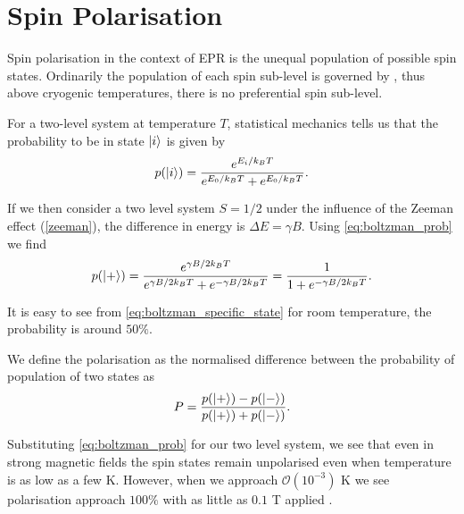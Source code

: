 \section{Spin Polarisation}\label{spin_polarisation}
Spin polarisation in the context of EPR is the unequal population of possible spin states. Ordinarily the population of each spin sub-level is governed by , thus above cryogenic temperatures, there is no preferential spin sub-level.

For a two-level system at temperature $T$, statistical mechanics tells us that the probability to
be in state $\ket{i}$ is given by 
\begin{equation}
    p(\ket{i}) = \frac{e^{E_i / k_B T}}{e^{E_0 / k_B T} + e^{E_0 / k_B T}}.
    \label{eq:boltzman_prob}
\end{equation}

If we then consider a two level system $S= 1/2$ under the influence of the Zeeman effect (\ref{zeeman}), the difference in energy is $\Delta E = \gamma B$. Using \eqref{eq:boltzman_prob} we find 
\begin{equation}
    p(\ket{+}) = \frac{e^{ \gamma B / 2 k_B T}}{e^{\gamma B / 2 k_B T} + e^{- \gamma B /2 k_B T}} = \frac{1}{1 + e^{-\gamma B/2 k_B T}}.
    \label{eq:boltzman_specific_state}
\end{equation}

It is easy to see from \eqref{eq:boltzman_specific_state} for room temperature, the probability is around $50\%$. 

We define the polarisation as the normalised difference between the probability of population of two states as 
\begin{equation}
    P = \frac{p(\ket{+}) - p(\ket{-})}{p(\ket{+}) + p(\ket{-})}.
    \label{eq:spin_polarisation}
\end{equation}

Substituting \eqref{eq:boltzman_prob} for our two level system, we see that even in strong magnetic fields the spin states remain unpolarised even when temperature is as low as a few K. However, when we approach $\mathcal{O}(10^{-3})$ K we see polarisation approach $100\%$ with as little as $0.1$ T applied \cite{Bonato}.  


